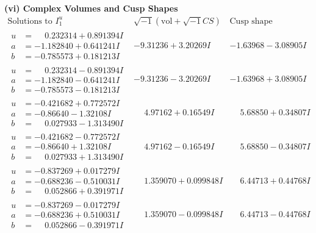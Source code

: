 \documentclass[1p]{elsarticle_modified}
\theoremstyle{definition}
\newcommand{\I}{\sqrt{-1}}
\begin{document}
\newpage\flushleft \textbf{(vi) Complex Volumes and Cusp Shapes}
$$\begin{array}{c|c|c}  
\text{Solutions to }I^u_{1}& \I (\text{vol} + \sqrt{-1}CS) & \text{Cusp shape}\\
 \hline 
\begin{aligned}
u &= \phantom{-}0.232314 + 0.891394 I \\
a &= -1.182840 + 0.641241 I \\
b &= -0.785573 + 0.181213 I\end{aligned}
 & -9.31236 + 3.20269 I & -1.63968 - 3.08905 I \\ \hline\begin{aligned}
u &= \phantom{-}0.232314 - 0.891394 I \\
a &= -1.182840 - 0.641241 I \\
b &= -0.785573 - 0.181213 I\end{aligned}
 & -9.31236 - 3.20269 I & -1.63968 + 3.08905 I \\ \hline\begin{aligned}
u &= -0.421682 + 0.772572 I \\
a &= -0.86640 - 1.32108 I \\
b &= \phantom{-}0.027933 - 1.313490 I\end{aligned}
 & \phantom{-}4.97162 + 0.16549 I & \phantom{-}5.68850 + 0.34807 I \\ \hline\begin{aligned}
u &= -0.421682 - 0.772572 I \\
a &= -0.86640 + 1.32108 I \\
b &= \phantom{-}0.027933 + 1.313490 I\end{aligned}
 & \phantom{-}4.97162 - 0.16549 I & \phantom{-}5.68850 - 0.34807 I \\ \hline\begin{aligned}
u &= -0.837269 + 0.017279 I \\
a &= -0.688236 - 0.510031 I \\
b &= \phantom{-}0.052866 + 0.391971 I\end{aligned}
 & \phantom{-}1.359070 + 0.099848 I & \phantom{-}6.44713 + 0.44768 I \\ \hline\begin{aligned}
u &= -0.837269 - 0.017279 I \\
a &= -0.688236 + 0.510031 I \\
b &= \phantom{-}0.052866 - 0.391971 I\end{aligned}
 & \phantom{-}1.359070 - 0.099848 I & \phantom{-}6.44713 - 0.44768 I \\ \hline\begin{aligned}

\end{aligned}
\end{array}$$
\end{document}
